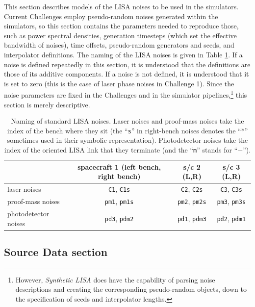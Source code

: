 \documentclass[11pt]{report}
\begin{document}
This section describes models of the LISA noises to be used in the simulators. Current Challenges employ pseudo-random noises generated within the simulators, so this section contains the parameters needed to reproduce those, such as power spectral densities, generation timesteps (which set the effective bandwidth of noises), time offsets, pseudo-random generators and seeds, and interpolator definitions. The naming of the LISA noises is given in Table \ref{tab:noiseref}. If a noise is defined repeatedly in this section, it is understood that the definitions are those of its additive components. If a noise is not defined, it is understood that it is set to zero (this is the case of laser phase noises in Challenge 1). Since the noise parameters are fixed in the Challenges and in the simulator pipelines,\footnote{However, \emph{Synthetic LISA} does have the capability of parsing noise descriptions and creating the corresponding pseudo-random objects, down to the specification of seeds and interpolator lengths.} this section is merely descriptive. 
%
\begin{table}
\begin{center}
\begin{tabular}{l|ccc}
& spacecraft 1 (left bench, right bench) & s/c 2 (L,R) & s/c 3 (L,R) \\
\hline
laser noises & \texttt{C1}, \texttt{C1s} & 
               \texttt{C2}, \texttt{C2s} & 
               \texttt{C3}, \texttt{C3s} \\ 
proof-mass noises & \texttt{pm1}, \texttt{pm1s} & 
               \texttt{pm2}, \texttt{pm2s} & 
               \texttt{pm3}, \texttt{pm3s} \\
photodetector noises & \texttt{pd3}, \texttt{pdm2} & 
               \texttt{pd1}, \texttt{pdm3} & 
               \texttt{pd2}, \texttt{pdm1}                
\end{tabular}
\end{center}
\caption{Naming of standard LISA noises.
Laser noises and proof-mass noises take the index of the bench
where they sit (the ``\texttt{s}'' in right-bench noises denotes the ``*'' sometimes used in their symbolic representation). Photodetector noises take the index of the oriented LISA link that they terminate (and the ``\texttt{m}'' stands for ``$-$'').\label{tab:noiseref}}
\end{table}

\subsection{Source Data section}
\end{document}
